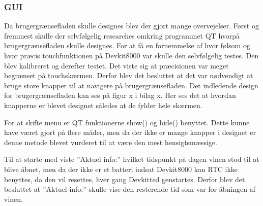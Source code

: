 \subsubsection{GUI}

Da brugergrænsefladen skulle designes blev der gjort mange overvejelser. Først og fremmest skulle der selvfølgelig researches omkring programmet QT hvorpå brugergrænsefladen skulle designes. For at få en fornemmelse af hvor følsom og hvor præcis touchfunktionen på Devkit8000 var skulle den selvfølgelig testes. Den blev kalibreret og derefter testet. Det viste sig at præcisionen var meget begrænset på touchskærmen. Derfor blev det besluttet at det var nødvendigt at bruge store knapper til at navigere på brugergrænsefladen. Det indledende design for brugergrænsefladen kan ses på figur x i bilag x. Her ses det at hvordan knapperne er blevet designet således at de fylder hele skærmen.

For at skifte menu er QT funktionerne show() og hide() benyttet. Dette kunne have været gjort på flere måder, men da der ikke er mange knapper i designet er denne metode blevet vurderet til at være den mest hensigtsmæssige.

Til at starte med viste ”Aktuel info:” hvilket tidspunkt på dagen vinen stod til at blive åbnet, men da der ikke er et batteri indsat Devkit8000 kan RTC ikke benyttes, da den vil resettes, hver gang Devkitted genstartes. Derfor blev det besluttet at ”Aktuel info:” skulle vise den resterende tid som var for åbningen af vinen.